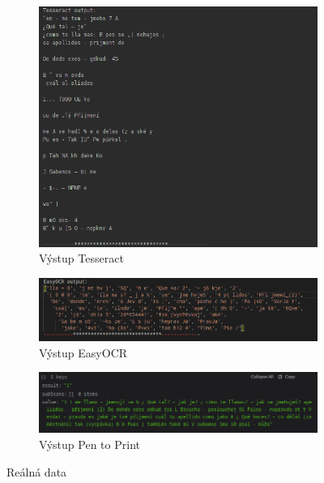 \documentclass[journal]{IEEEtran}
\begin{document}
\begin{figure}

\begin{subfigure}{\linewidth}
        \centering
        \includegraphics[width=\linewidth]{Images/Tesseract_Page1.png}
        \caption{Výstup Tesseract}
        \label{fig:Tesseract_Page1}
\end{subfigure}

\begin{subfigure}{\linewidth}
        \centering
        \includegraphics[width=\linewidth]{Images/easyOCR_Page1.png}
        \caption{Výstup EasyOCR}
        \label{fig:easyOCR_Page1}
\end{subfigure}

\begin{subfigure}{\linewidth}
        \centering
        \includegraphics[width=\linewidth]{Images/penToPrint_RealDataAdjusted.png}
        \caption{Výstup Pen to Print}
        \label{fig:penToPrint_RalDataAdjusted}
\end{subfigure}
\caption{Reálná data}

\end{figure}
\end{document}

